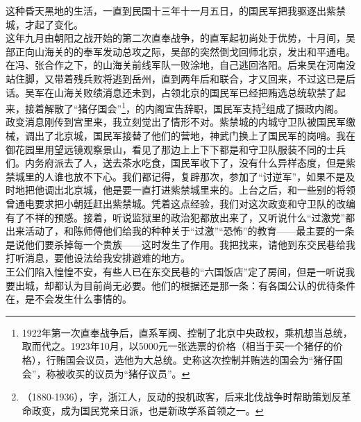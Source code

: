 这种昏天黑地的生活，一直到民国十三年十一月五日，的国民军把我驱逐出紫禁城，才起了变化。\\

这年九月由朝阳之战开始的第二次直奉战争，的直军起初尚处于优势，十月间，吴部正向山海关的的奉军发动总攻之际，吴部的突然倒戈回师北京，发出和平通电。在冯、张合作之下，的山海关前线军队一败涂地，自己逃回洛阳。后来吴在河南没站住脚，又带着残兵败将逃到岳州，直到两年后和联合，才又回来，不过这已是后话。吴军在山海关败绩消息还未到，占领北京的国民军已经把贿选总统软禁了起来，接着解散了“猪仔国会”\footnote{1922年第一次直奉战争后，直系军阀、控制了北京中央政权，乘机想当总统，取而代之。1923年10月，以5000元一张选票的价格（相当于买一个猪仔的价格），行贿国会议员，选他为大总统。史称这次控制并贿选的国会为“猪仔国会”，称被收买的议员为“猪仔议员”。}，的内阁宣告辞职，国民军支持\footnote{（1880-1936），字，浙江人，反动的投机政客，后来北伐战争时帮助策划反革命政变，成为国民党亲日派，也是新政学系首领之一。}组成了摄政内阁。\\

政变消息刚传到宫里来，我立刻觉出了情形不对。紫禁城的内城守卫队被国民军缴械，调出了北京城，国民军接替了他们的营地，神武门换上了国民军的岗哨。我在御花园里用望远镜观察景山，看见了那边上上下下都是和守卫队服装不同的士兵们。内务府派去了人，送去茶水吃食，国民军收下了，没有什么异样态度，但是紫禁城里的人谁也放不下心。我们都记得，复辟那次，参加了“讨逆军”，如果不是及时地把他调出北京城，他是要一直打进紫禁城里来的。上台之后，和一些别的将领曾通电要求把小朝廷赶出紫禁城。凭着这点经验，我们对这次政变和守卫队的改编有了不祥的预感。接着，听说监狱里的政治犯都放出来了，又听说什么“过激党”都出来活动了，和陈师傅他们给我的种种关于“过激”“恐怖”的教育——最主要的一条是说他们要杀掉每一个贵族——这时发生了作用。我把找来，请他到东交民巷给我打听消息，要他设法给我安排避难的地方。\\

王公们陷入惶惶不安，有些人已在东交民巷的“六国饭店”定了房间，但是一听说我要出城，却都认为目前尚无必要。他们的根据还是那一条：有各国公认的优待条件在，是不会发生什么事情的。\\

